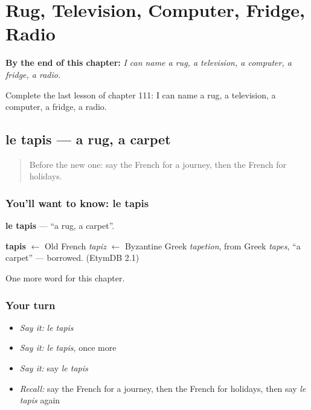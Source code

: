 
\chapter{Rug, Television, Computer, Fridge, Radio}
\label{ch:fr-rug-television-computer-fridge-radio}

\begin{chapteropening}
\textbf{By the end of this chapter:} \emph{I can name a rug, a television, a computer, a fridge, a radio.}

Complete the last lesson of chapter 111: I can name a rug, a television, a computer, a fridge, a radio.
\end{chapteropening}

\section[le tapis]{le tapis — a rug, a carpet}

\label{lesson:FR-C111-tapis}



\begin{quote}
Before the new one: say the French for a journey, then the French for holidays.
\end{quote}

\subsection*{You'll want to know: le tapis}
\textbf{le tapis} — \textquotedblleft{}a rug, a carpet\textquotedblright{}.

\begin{cousinweb}
\textbf{tapis} $\leftarrow$ Old French \emph{tapiz} $\leftarrow$ Byzantine Greek \emph{tapetion}, from Greek \emph{tapes}, \textquotedblleft{}a carpet\textquotedblright{} — borrowed. (EtymDB 2.1)
\end{cousinweb}

\begin{grammarlens}[title={What you've built}]
One more word for this chapter.
\end{grammarlens}

\subsection*{Your turn}
\begin{itemize}
\raggedright
  \item \emph{Say it:} \emph{le tapis}
  \item \emph{Say it:} \emph{le tapis}, once more
  \item \emph{Say it:} say \emph{le tapis}
  \item \emph{Recall:} say the French for a journey, then the French for holidays, then say \emph{le tapis} again
\end{itemize}

